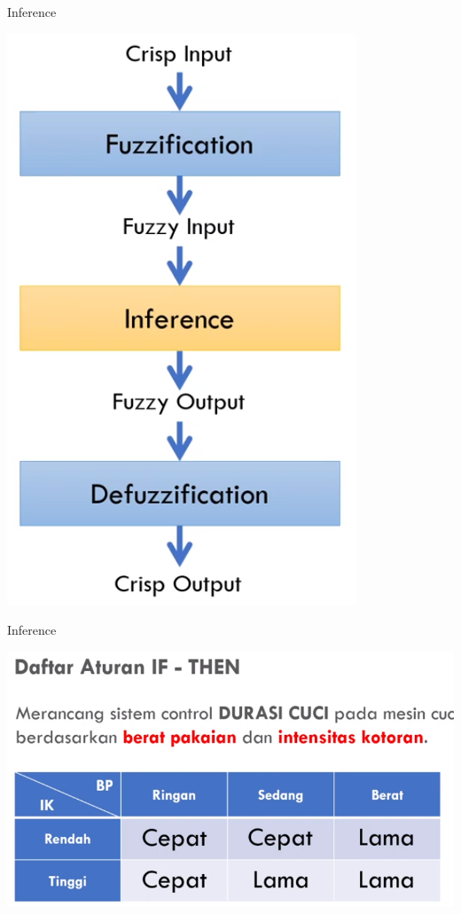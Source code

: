 \documentclass[pdflatex,compress,mathserif]{beamer}
\begin{document}
\begin{frame}{Inference}
	\begin{center}
		\includegraphics[height=0.8\textheight]{img/inference}
	\end{center}
\end{frame}

\begin{frame}{Inference}
	\begin{center}
		\includegraphics[height=0.6\textheight]{img/28}
	\end{center}
\end{frame}
\end{document}

